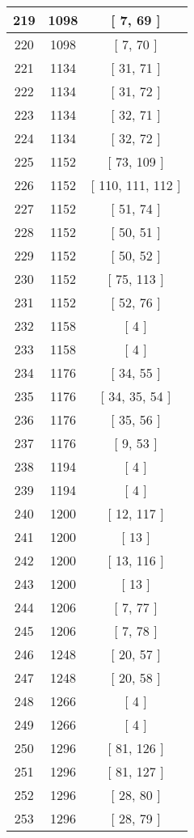 \begin{center}
\begin{longtable}[H]{|| c c c ||}
\hline
219 & 1098 & [ 7, 69 ] \\ 
\hline
220 & 1098 & [ 7, 70 ] \\ 
\hline
221 & 1134 & [ 31, 71 ] \\ 
\hline
222 & 1134 & [ 31, 72 ] \\ 
\hline
223 & 1134 & [ 32, 71 ] \\ 
\hline
224 & 1134 & [ 32, 72 ] \\ 
\hline
225 & 1152 & [ 73, 109 ] \\ 
\hline
226 & 1152 & [ 110, 111, 112 ] \\ 
\hline
227 & 1152 & [ 51, 74 ] \\ 
\hline
228 & 1152 & [ 50, 51 ] \\ 
\hline
229 & 1152 & [ 50, 52 ] \\ 
\hline
230 & 1152 & [ 75, 113 ] \\ 
\hline
231 & 1152 & [ 52, 76 ] \\ 
\hline
232 & 1158 & [ 4 ] \\ 
\hline
233 & 1158 & [ 4 ] \\ 
\hline
234 & 1176 & [ 34, 55 ] \\ 
\hline
235 & 1176 & [ 34, 35, 54 ] \\ 
\hline
236 & 1176 & [ 35, 56 ] \\ 
\hline
237 & 1176 & [ 9, 53 ] \\ 
\hline
238 & 1194 & [ 4 ] \\ 
\hline
239 & 1194 & [ 4 ] \\ 
\hline
240 & 1200 & [ 12, 117 ] \\ 
\hline
241 & 1200 & [ 13 ] \\ 
\hline
242 & 1200 & [ 13, 116 ] \\ 
\hline
243 & 1200 & [ 13 ] \\ 
\hline
244 & 1206 & [ 7, 77 ] \\ 
\hline
245 & 1206 & [ 7, 78 ] \\ 
\hline
246 & 1248 & [ 20, 57 ] \\ 
\hline
247 & 1248 & [ 20, 58 ] \\ 
\hline
248 & 1266 & [ 4 ] \\ 
\hline
249 & 1266 & [ 4 ] \\ 
\hline
250 & 1296 & [ 81, 126 ] \\ 
\hline
251 & 1296 & [ 81, 127 ] \\ 
\hline
252 & 1296 & [ 28, 80 ] \\ 
\hline
253 & 1296 & [ 28, 79 ] \\ 
\hline

\end{longtable}
\end{center}
